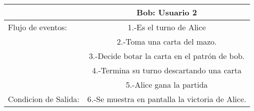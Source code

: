 \begin{center}
\begin{tabular}{ l | c  }
                                         & Bob: Usuario  2                                              \\\hline
        Flujo de eventos:                & 1.-Es el turno de Alice                                 \\
                                         & 2.-Toma una carta del mazo.\\\hline
                                         & 3.-Decide botar la carta en el patrón de bob. \\\hline
                                         & 4.-Termina su turno descartando una carta               \\\hline
                                         & 5.-Alice gana la partida              \\\hline
        Condicion de Salida:             & 6.-Se muestra en pantalla la victoria de Alice.             \\\hline
        \hline
    \end{tabular}
    

\end{center}
